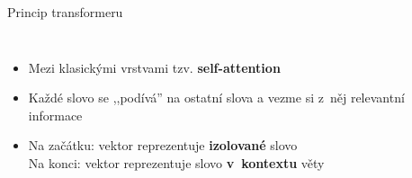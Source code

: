 \documentclass[aspectratio=169,dvipsnames]{beamer}
\begin{document}

\begin{frame}{Princip transformeru}

    \begin{columns}

        \scalebox{.8}{}

        \begin{itemize}[<+->]

            \item Mezi klasickými vrstvami tzv. \textbf{self-attention}

            \item Každé slovo se ,,podívá'' na ostatní slova a vezme si z~něj
                relevantní informace

            \item Na začátku: vektor reprezentuje \textbf{izolované} slovo \\
                Na konci: vektor reprezentuje slovo \textbf{v~kontextu} věty

        \end{itemize}

    \end{columns}

    \vspace{10pt}

\end{frame}


%
%
%
%
\end{document}

